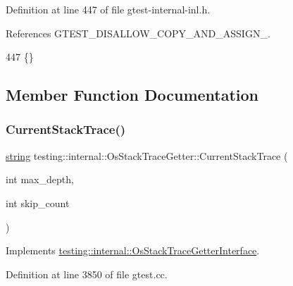 Definition at line 447 of file gtest-\/internal-\/inl.\+h.



References G\+T\+E\+S\+T\+\_\+\+D\+I\+S\+A\+L\+L\+O\+W\+\_\+\+C\+O\+P\+Y\+\_\+\+A\+N\+D\+\_\+\+A\+S\+S\+I\+G\+N\+\_\+.


\begin{DoxyCode}
447 \{\}
\end{DoxyCode}


\subsection{Member Function Documentation}
\mbox{\label{classtesting_1_1internal_1_1OsStackTraceGetter_ad85d7766a222befa3e7f3c6932046ac2}} 
\subsubsection{\texorpdfstring{Current\+Stack\+Trace()}{CurrentStackTrace()}}
{\footnotesize\ttfamily \hyperlink{namespacetesting_1_1internal_a8e8ff5b11e64078831112677156cb111}{string} testing\+::internal\+::\+Os\+Stack\+Trace\+Getter\+::\+Current\+Stack\+Trace (\begin{DoxyParamCaption}\item[{int}]{max\+\_\+depth,  }\item[{int}]{skip\+\_\+count }\end{DoxyParamCaption})\hspace{0.3cm}{\ttfamily [virtual]}}



Implements \hyperlink{classtesting_1_1internal_1_1OsStackTraceGetterInterface_a6965eadb9b340808718fab9f1475c49a}{testing\+::internal\+::\+Os\+Stack\+Trace\+Getter\+Interface}.



Definition at line 3850 of file gtest.\+cc.


